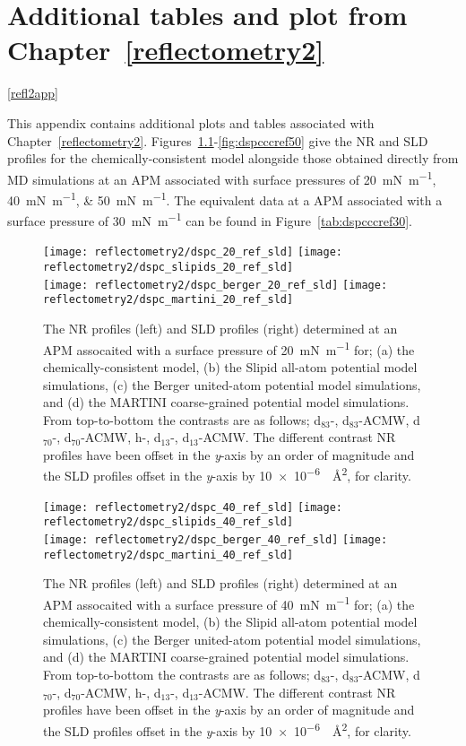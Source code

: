 \chapter{Additional tables and plot from Chapter~\ref{reflectometry2}}

\ref{refl2app}

This appendix contains additional plots and tables associated with Chapter~\ref{reflectometry2}. 
Figures~\ref{fig:dspcccref20}-\ref{fig:dspcccref50} give the NR and SLD profiles for the chemically-consistent model alongside those obtained directly from MD simulations at an APM associated with surface pressures of \SIlist{20;40;50}{\milli\newton\per\meter}.
The equivalent data at a APM associated with a surface pressure of \SI{30}{\milli\newton\per\meter} can be found in Figure~\ref{tab:dspcccref30}. 
%
\begin{figure}
    \centering
    \texttt{[image: reflectometry2/dspc\_20\_ref\_sld]}
    \texttt{[image: reflectometry2/dspc\_slipids\_20\_ref\_sld]}\\
    \texttt{[image: reflectometry2/dspc\_berger\_20\_ref\_sld]}
    \texttt{[image: reflectometry2/dspc\_martini\_20\_ref\_sld]}
    \caption{The NR profiles (left) and SLD profiles (right) determined at an APM assocaited with a surface pressure of \SI{20}{\milli\newton\per\meter} for; (a) the chemically-consistent model, (b) the Slipid all-atom potential model simulations, (c) the Berger united-atom potential model simulations, and (d) the MARTINI coarse-grained potential model simulations. From top-to-bottom the contrasts are as follows; d$_{83}$-, d$_{83}$-ACMW, d$_{70}$-, d$_{70}$-ACMW, h-, d$_{13}$-, d$_{13}$-ACMW. The different contrast NR profiles have been offset in the \emph{y}-axis by an order of magnitude and the SLD profiles offset in the \emph{y}-axis by \SI{10e-6}{\per\angstrom\squared}, for clarity.}
    \label{fig:dspcccref20}
\end{figure}
%
%
\begin{figure}
    \centering
    \texttt{[image: reflectometry2/dspc\_40\_ref\_sld]}
    \texttt{[image: reflectometry2/dspc\_slipids\_40\_ref\_sld]}\\
    \texttt{[image: reflectometry2/dspc\_berger\_40\_ref\_sld]}
    \texttt{[image: reflectometry2/dspc\_martini\_40\_ref\_sld]}
    \caption{The NR profiles (left) and SLD profiles (right) determined at an APM assocaited with a surface pressure of \SI{40}{\milli\newton\per\meter} for; (a) the chemically-consistent model, (b) the Slipid all-atom potential model simulations, (c) the Berger united-atom potential model simulations, and (d) the MARTINI coarse-grained potential model simulations. From top-to-bottom the contrasts are as follows; d$_{83}$-, d$_{83}$-ACMW, d$_{70}$-, d$_{70}$-ACMW, h-, d$_{13}$-, d$_{13}$-ACMW. The different contrast NR profiles have been offset in the \emph{y}-axis by an order of magnitude and the SLD profiles offset in the \emph{y}-axis by \SI{10e-6}{\per\angstrom\squared}, for clarity.}
    \label{fig:dspcccref40}
\end{figure}
